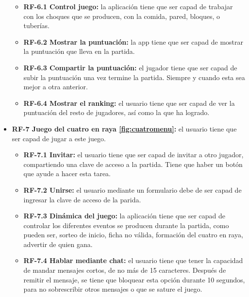 \begin{itemize}
	\begin{itemize}
		\tightlist
		\item \textbf{RF-6.1 Control juego:} la aplicación tiene que ser capad de trabajar con los choques que se producen, con la comida, pared, bloques, o tuberías.
		\item \textbf{RF-6.2 Mostrar la puntuación:} la app tiene que ser capad de mostrar la puntuación que lleva en la partida.
		\item \textbf{RF-6.3 Compartir la puntuación:} el jugador tiene que ser capad de subir la puntuación una vez termine la partida. Siempre y cuando esta sea mejor a otra anterior.
		\item \textbf{RF-6.4 Mostrar el ranking:} el usuario tiene que ser capad de ver la puntuación del resto de jugadores, así como la que ha logrado.
	\end{itemize}

	\item \textbf{RF-7 Juego del cuatro en raya \ref{fig:cuatromenu}:} el usuario tiene que ser capad de jugar a este juego.
	
	\begin{itemize}
		\tightlist
		\item \textbf{RF-7.1 Invitar:} el usuario tiene que ser capad de invitar a otro jugador, compartiendo una clave de acceso a la partida. Tiene que haber un botón que ayude a hacer esta tarea.
		\item \textbf{RF-7.2 Unirse:} el usuario mediante un formulario debe de ser capad de ingresar la clave de acceso de la parida.
		\item \textbf{RF-7.3 Dinámica del juego:} la aplicación tiene que ser capad de controlar los diferentes eventos se producen durante la partida, como pueden ser, sorteo de inicio, ficha no válida, formación del cuatro en raya, advertir de quien gana.
		\item \textbf{RF-7.4 Hablar mediante chat:} el usuario tiene que tener la capacidad de mandar mensajes cortos, de no más de 15 caracteres. Después de remitir el mensaje, se tiene que bloquear esta opción durante 10 segundos, para no sobrescribir otros mensajes o que se sature el juego.
	\end{itemize}

\end{itemize}

